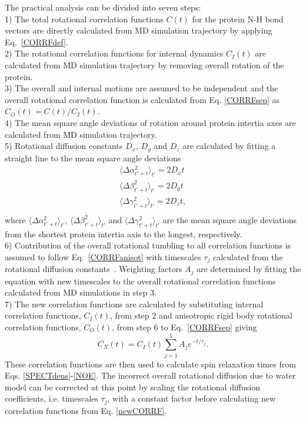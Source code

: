 \documentclass[pre,aps,floatfix,authordate1-4,twocolumn]{revtex4-1}
\begin{document}
The practical analysis can be divided into seven steps: \\
1) The total rotational correlation functions $C(t)$
for the protein N-H bond vectors are directly calculated from MD simulation trajectory
by applying Eq.~\ref{CORRFdef}. \\
2) The rotational correlation functions for internal
dynamics $C_I(t)$ are calculated from MD simulation trajectory
by removing overall rotation of the protein. \\
3) The overall and internal motions are assumed to be independent and the overall
rotational correlation function is calculated from Eq. \ref{CORRFsep} as $C_O(t)=C(t)/C_I(t)$. \\
4) The mean square angle deviations of rotation around protein intertia axes
are calculated from MD simulation trajectory. \\
5) Rotational diffusion constants $D_x$, $D_y$ and $D_z$ are calculated by fitting a straight line
to the mean square angle deviations 
\begin{equation}\label{DIFFdef}
  \begin{aligned}
    \langle \Delta \alpha_{t'+t}^2 \rangle_{t'} = 2 D_{x} t \\
    \langle \Delta \beta_{t'+t}^2 \rangle_{t'} = 2 D_{y} t \\
    \langle \Delta \gamma_{t'+t}^2 \rangle_{t'} = 2 D_{z} t, \\
  \end{aligned}
\end{equation}
where $\langle \Delta \alpha_{t'+t}^2 \rangle_{t'}$,
$\langle \Delta \beta_{t'+t}^2 \rangle_{t'}$ and
$\langle \Delta \gamma_{t'+t}^2 \rangle_{t'}$ are
the mean square angle deviations from the shortest protein
intertia axis to the longest, respectively.\\
6) Contribution of the overall rotational tumbling to all correlation
functions is assumed to follow Eq.~\ref{CORRFanisot} with
timescales $\tau_j$ calculated from the rotational diffusion constants~\cite{Note1}.
Weighting factors $A_j$ are determined by fitting the equation with new timescales
to the overall rotational correlation functions calculated from MD simulations in step 3. \\
7) The new correlation functions are calculated by substituting
internal correlation functions, $C_I(t)$, from step 2 and anisotropic rigid body
rotational correlation functions, $C_O(t)$, from step 6 to
Eq.~\ref{CORRFsep} giving
\begin{equation}\label{newCORRF}
  C_N(t)=C_I(t)\sum_{j=1}^5 A_j e^{-t/\tau_j}.
\end{equation}
These correlation functions are then used to calculate spin relaxation times
from Eqs. \ref{SPECTdens}-\ref{NOE}. The incorrect overall rotational
diffusion due to water model can be corrected at this point  by scaling the rotational diffusion
coefficients, i.e. timescales $\tau_j$, with a constant factor before calculating
new correlation functions from Eq. \ref{newCORRF}.
\end{document}
